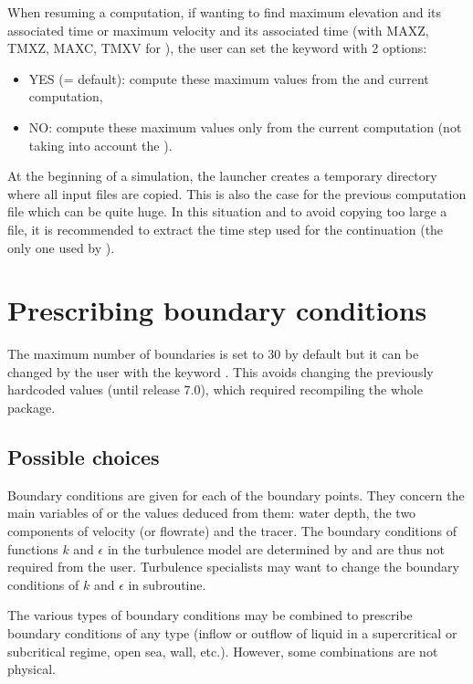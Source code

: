 When resuming a computation, if wanting to find maximum elevation and its
associated time or maximum velocity and its associated time (with MAXZ, TMXZ,
MAXC, TMXV for ), the user can set
the keyword  with
2 options:
\begin{itemize}
\item YES (= default): compute these maximum values from the
 and current computation,
\item NO: compute these maximum values only from the current computation
(not taking into account the ).
\end{itemize}

At the beginning of a simulation, the launcher creates a temporary directory
where all input files are copied.
This is also the case for the previous computation file which can be quite huge.
In this situation and to avoid copying too large a file,
it is recommended to extract the time step used for the continuation
(the only one used by ).


\section{Prescribing boundary conditions}
\label{sec:presc:bc}

The maximum number of boundaries is set to 30 by default but it can be changed
by the user with the keyword .
This avoids changing the previously hardcoded values (until release 7.0),
which required recompiling the whole package.

\subsection{Possible choices}

Boundary conditions are given for each of the boundary points.
They concern the main variables of  or the values deduced from them:
water depth, the two components of velocity (or flowrate) and the tracer.
The boundary conditions of functions $k$ and $\epsilon$ in the turbulence model
are determined by  and are thus not required from the user.
Turbulence specialists may want to change the boundary conditions of $k$
and $\epsilon$ in  subroutine.

The various types of boundary conditions may be combined to prescribe boundary
conditions of any type (inflow or outflow of liquid in a supercritical or
subcritical regime, open sea, wall, etc.).
However, some combinations are not physical.

